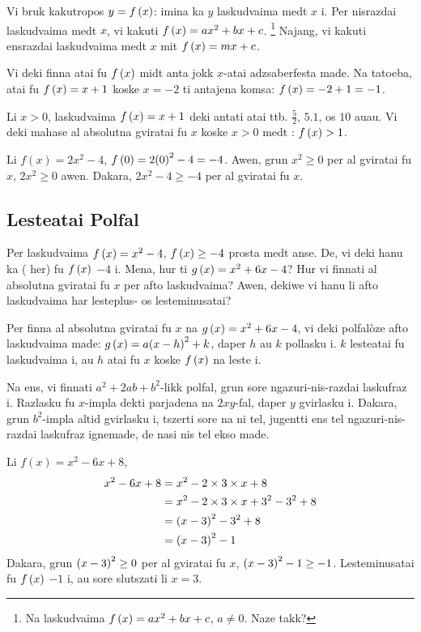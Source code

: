 Vi bruk kakutropos \(y = f\left(x\right)\): imina ka \(y\) laskudvaima medt \(x\) i.
Per nisrazdai laskudvaima medt \(x\), vi kakuti
\(f \left(x\right) = ax^2 + bx + c\). \footnote{Na  laskudvaima
	\(f \left(x\right) = ax^2 + bx + c\), \(a \neq 0\). Naze takk?}
Najang, vi kakuti ensrazdai laskudvaima medt \(x\) mit \(f \left(x\right) = mx + c\).

Vi deki finna atai fu \(f \left(x\right)\) midt anta jokk \(x\)-atai adzsaberfesta made.
Na tatoeba, atai fu \(f \left(x\right) = x + 1\) koske \(x = -2\) ti antajena komsa: \(f \left(x\right) = -2 + 1 = -1\).

Li \(x > 0\), laskudvaima \(f \left(x\right) = x + 1\) deki antati atai ttb. \(\frac{5}{2}\), \(5.1\), os \(10\) auau.
Vi deki mahase al absolutna gviratai fu \(x\) koske \(x > 0\) medt : \(f \left(x\right) > 1\).

\begin{example}
  Li \(f\left(x\right) = 2x^2 - 4\), \(f\left(0\right) = 2{\left(0\right)}^2 - 4 = -4\). Awen, grun
  \(x^2 \geq 0\) per al gviratai fu \(x\), \(2x^2 \geq 0\) awen. Dakara,
  \(2x^2 - 4 \geq -4\) per al gviratai fu \(x\).
\end{example}

\subsection{Lesteatai Polfal}

Per laskudvaima \(f \left(x\right) = x^2 - 4\), \(f\left(x\right) \geq - 4\) prosta medt anse. De, vi deki hanu
ka  ( her) fu \(f\left(x\right)\) \(-4\) i. Mena, hur ti
\(g \left(x\right) = x^2+6x-4\)? Hur vi finnati al absolutna gviratai fu \(x\) per afto laskudvaima?
Awen, dekiwe vi hanu li afto laskudvaima har lesteplus- os lesteminusatai?

Per finna al absolutna gviratai fu \(x\) na \(g \left(x\right)=x^2+6x-4\), vi deki polfalòze afto
laskudvaima  made: \(g \left(x\right) = a{\left(x-h\right)}^2+k\), daper
\(h\) au \(k\) pollasku i. \(k\) lesteatai fu laskudvaima i, au \(h\) atai fu \(x\) koske \(f \left(x\right)\)
na leste i.

Na ens, vi finnati \(a^2 + 2ab + b^2\)-likk polfal, grun sore ngazuri-nis-razdai laskufraz i.
Razlasku fu \(x\)-impla dekti parjadena na \(2xy\)-fal, daper \(y\) gvirlasku i.
Dakara, grun \(b^2\)-impla altid gvirlasku i, tszerti sore na ni tel, jugentti ens tel ngazuri-nis-razdai
laskufraz ignemade, de nasi nis tel ekso made.

\begin{example}
  Li \(f\left(x\right) = x^2 - 6x + 8\), 
  \begin{align*}
    x^2 - 6x + 8 &= x^2 - 2 \times 3 \times x + 8 \\
    &= x^2 - 2 \times 3 \times x + 3^2 - 3^2 + 8 \\
    &= {\left(x - 3\right)}^2 - 3^2 + 8 \\
    &= {\left(x - 3\right)}^2 - 1
  \end{align*}
  Dakara, grun \({\left(x - 3\right)}^2 \geq 0\) per al gviratai fu \(x\),
  \({\left(x - 3\right)}^2 - 1 \geq - 1\). Lesteminusatai fu \(f\left(x\right)\) \(-1\) i,
  au sore slutszati li \(x = 3\).
\end{example}


